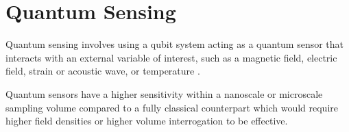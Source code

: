\section{Quantum Sensing}
Quantum sensing involves using a qubit system acting as a quantum sensor that interacts with an external variable of
interest, such as a magnetic field, electric field, strain or acoustic wave, or temperature \cite{Castelletto_2024}. 

Quantum sensors have a higher sensitivity within a nanoscale or microscale sampling volume compared to a fully classical counterpart which would require higher field densities or higher volume interrogation to be effective. 

\cite{Wolfowicz2021}

\cite{Kin2021}


\cite{Cochrane2016}


\cite{Xie2021}


\cite{DiVincenzo1995}


